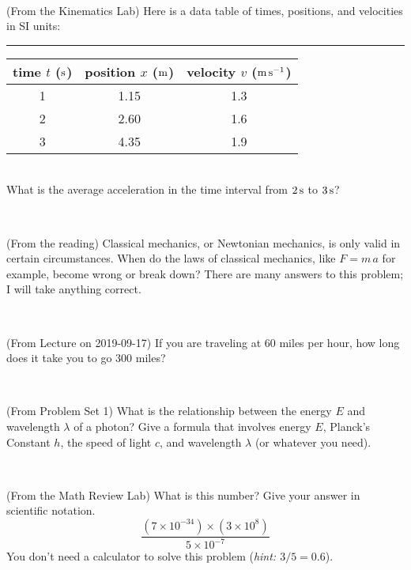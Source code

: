 \documentclass[12pt, letterpaper]{article}
\begin{document}
\vfill ~

\begin{problem} (From the Kinematics Lab)
Here is a data table of times, positions, and velocities in SI units:\\
\rule{1.0in}{0pt}\begin{tabular}{c|c|c}
time $t$ ($\mathrm{s}$) & position $x$ ($\mathrm{m}$) & velocity $v$ ($\mathrm{m}\,\mathrm{s}^{-1}$) \\
\hline
1 & 1.15 & 1.3 \\
2 & 2.60 & 1.6 \\
3 & 4.35 & 1.9 \\
\hline
\end{tabular}\\
What is the average acceleration in the time interval from $2\,\mathrm{s}$ to $3\,\mathrm{s}$?
\end{problem}


\vfill ~


\clearpage


\begin{problem} (From the reading)
Classical mechanics, or Newtonian mechanics, is only valid in certain
circumstances. When do the laws of classical mechanics, like $F =
m\,a$ for example, become wrong or break down? There are many answers
to this problem; I will take anything correct.
\end{problem}


\vfill ~

\begin{problem} (From Lecture on 2019-09-17)
If you are traveling at 60 miles per hour, how long does
it take you to go 300 miles?
\end{problem}


\vfill ~

\begin{problem} (From Problem Set 1)
What is the relationship between the energy $E$ and wavelength
$\lambda$ of a photon? Give a formula that involves energy $E$,
Planck's Constant $h$, the speed of light $c$, and wavelength
$\lambda$ (or whatever you need).
\end{problem}

\vfill ~

\begin{problem} (From the Math Review Lab)
What is this number? Give your answer in scientific notation.
$$
\frac{(7\times10^{-34})\times(3\times10^8)}{5\times10^{-7}}
$$
You don't need a calculator to solve this problem (\textit{hint: $3/5=0.6$}).
\end{problem}
\end{document}
